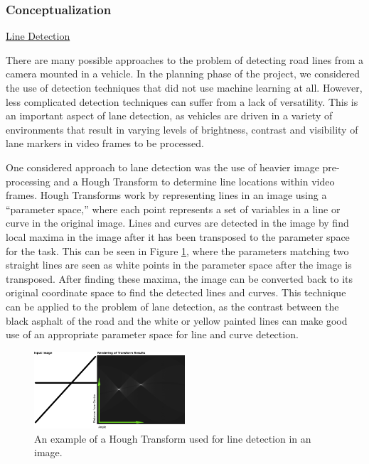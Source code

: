 \documentclass[titlepage,draft]{article}
\begin{document}
\subsubsection{Conceptualization}
\underline{Line Detection}

There are many possible approaches to the problem of detecting road lines from a camera mounted in a vehicle.
In the planning phase of the project, we considered the use of detection techniques that did not use machine learning at all.
However, less complicated detection techniques can suffer from a lack of versatility.
This is an important aspect of lane detection, as vehicles are driven in a variety of environments that result in varying
levels of brightness, contrast and visibility of lane markers in video frames to be processed.

One considered approach to lane detection was the use of heavier image pre-processing and a Hough Transform to determine line
locations within video frames.
Hough Transforms work by representing lines in an image using a ``parameter space,'' where each point represents a set of
variables in a line or curve in the original image.
Lines and curves are detected in the image by find local maxima in the image after it has been transposed to the parameter space
for the task.
This can be seen in Figure \ref{HoughTransform}, where the parameters matching two straight lines are seen as white points in
the parameter space after the image is transposed.
After finding these maxima, the image can be converted back to its original coordinate space to find the detected lines and
curves.
This technique can be applied to the problem of lane detection, as the contrast between the black asphalt of the road and the
white or yellow painted lines can make good use of an appropriate parameter space for line and curve detection.

\begin{figure}
	\centering
	\includegraphics[width=0.5\textwidth]{Hough-example}
	\caption{An example of a Hough Transform used for line detection in an image.}
	\label{HoughTransform}
\end{figure}
\end{document}

